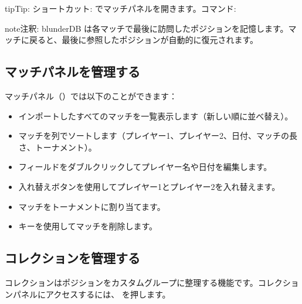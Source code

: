 \documentclass[letterpaper,10pt,dvipdfmx]{sphinxmanual}
\begin{document}
\begin{sphinxadmonition}{tip}{Tip:}
\sphinxAtStartPar
ショートカット:  でマッチパネルを開きます。コマンド: 
\end{sphinxadmonition}

\begin{sphinxadmonition}{note}{注釈:}
\sphinxAtStartPar
blunderDB は各マッチで最後に訪問したポジションを記憶します。マッチに戻ると、最後に参照したポジションが自動的に復元されます。
\end{sphinxadmonition}


\subsection{マッチパネルを管理する}
\label{\detokenize{guide_utilisateur:gerer-le-panneau-des-matchs}}
\sphinxAtStartPar
マッチパネル（）では以下のことができます：
\begin{itemize}
\item {} 
\sphinxAtStartPar
インポートしたすべてのマッチを一覧表示します（新しい順に並べ替え）。

\item {} 
\sphinxAtStartPar
マッチを列でソートします（プレイヤー1、プレイヤー2、日付、マッチの長さ、トーナメント）。

\item {} 
\sphinxAtStartPar
フィールドをダブルクリックしてプレイヤー名や日付を編集します。

\item {} 
\sphinxAtStartPar
入れ替えボタンを使用してプレイヤー1とプレイヤー2を入れ替えます。

\item {} 
\sphinxAtStartPar
マッチをトーナメントに割り当てます。

\item {} 
\sphinxAtStartPar
{} キーを使用してマッチを削除します。

\end{itemize}


\subsection{コレクションを管理する}
\label{\detokenize{guide_utilisateur:gerer-les-collections}}
\sphinxAtStartPar
コレクションはポジションをカスタムグループに整理する機能です。コレクションパネルにアクセスするには、 を押します。
\end{document}

